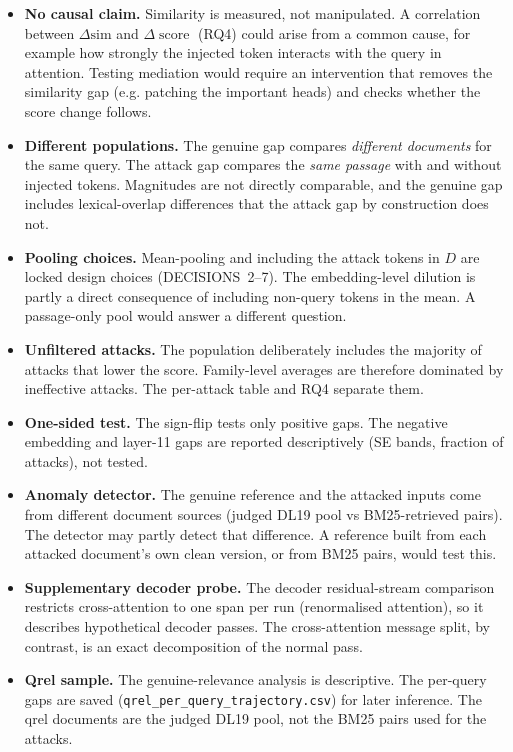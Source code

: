 \documentclass[11pt]{article}
\newcommand{\dsim}{\ensuremath{\Delta\mathrm{sim}}}
\newcommand{\score}{\operatorname{score}}
\begin{document}
\begin{itemize}[leftmargin=*]
  \item \textbf{No causal claim.} Similarity is measured, not manipulated. A
        correlation between $\dsim$ and $\Delta\score$ (RQ4) could arise from a
        common cause, for example how strongly the injected token interacts with the
        query in attention. Testing mediation would require an intervention that
        removes the similarity gap (e.g. patching the important heads) and checks
        whether the score change follows.
  \item \textbf{Different populations.} The genuine gap compares \emph{different
        documents} for the same query. The attack gap compares the \emph{same passage}
        with and without injected tokens. Magnitudes are not directly comparable, and
        the genuine gap includes lexical-overlap differences that the attack gap by
        construction does not.
  \item \textbf{Pooling choices.} Mean-pooling and including the attack tokens in $D$
        are locked design choices (DECISIONS~2--7). The embedding-level dilution is
        partly a direct consequence of including non-query tokens in the mean. A
        passage-only pool would answer a different question.
  \item \textbf{Unfiltered attacks.} The population deliberately includes the
        majority of attacks that lower the score. Family-level averages are therefore
        dominated by ineffective attacks. The per-attack table and RQ4 separate them.
  \item \textbf{One-sided test.} The sign-flip tests only positive gaps. The negative
        embedding and layer-11 gaps are reported descriptively (SE bands, fraction of
        attacks), not tested.
  \item \textbf{Anomaly detector.} The genuine reference and the attacked inputs come
        from different document sources (judged DL19 pool vs BM25-retrieved pairs). The
        detector may partly detect that difference. A reference built from each attacked
        document's own clean version, or from BM25 pairs, would test this.
  \item \textbf{Supplementary decoder probe.} The decoder residual-stream comparison
        restricts cross-attention to one span per run (renormalised attention), so it
        describes hypothetical decoder passes. The cross-attention message split, by
        contrast, is an exact decomposition of the normal pass.
  \item \textbf{Qrel sample.} The genuine-relevance analysis is descriptive. The
        per-query gaps are saved (\texttt{qrel\_per\_query\_trajectory.csv}) for later
        inference. The qrel documents are the judged DL19 pool, not the BM25 pairs used
        for the attacks.
\end{itemize}
\end{document}
